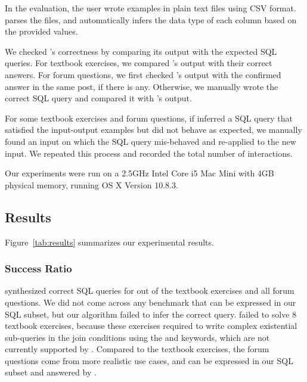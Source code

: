 In the evaluation, the \ourtool user wrote examples in
plain text files using CSV format. \ourtool parses the
files, and automatically infers the data type
of each column based on the provided values.

We checked \ourtool's correctness by comparing its
output with the expected SQL queries.
For textbook exercises, we compared \ourtool's output with
their correct answers. For forum questions, we first
checked \ourtool's output with the confirmed answer
in the same post, if there is any. Otherwise, we
manually wrote the correct SQL query and
compared it with \ourtool's output.

For some textbook exercises and forum questions,
if \ourtool inferred a SQL query that satisfied the input-output
examples but did not behave as expected,
we manually found an input on which the
SQL query mis-behaved and re-applied \ourtool to the new input. We
repeated this process and recorded the total number of
interactions.


Our experiments were run on a 2.5GHz Intel Core i5 Mac Mini
with 4GB physical memory, running OS X Version 10.8.3.





\vspace{-2mm}
\subsection{Results}
\vspace{-1mm}

Figure~\ref{tab:results} summarizes our experimental results.

\subsubsection{Success Ratio}
\label{sec:ratio}


\ourtool synthesized correct SQL queries for \solexnum  out of
the \exnum textbook exercises and 
all \pnum forum questions.
We did not come across any benchmark
that can be expressed in our SQL subset,
but our algorithm failed to infer the correct query.
\ourtool failed to solve 8 textbook exercises,
because these exercises required to write
complex existential sub-queries in the join conditions
using the  and  keywords,
which are not currently supported by \ourtool.
Compared to the textbook exercises, the \pnum
forum questions come from more realistic use cases,
and can be expressed in our SQL subset
and answered by \ourtool.



